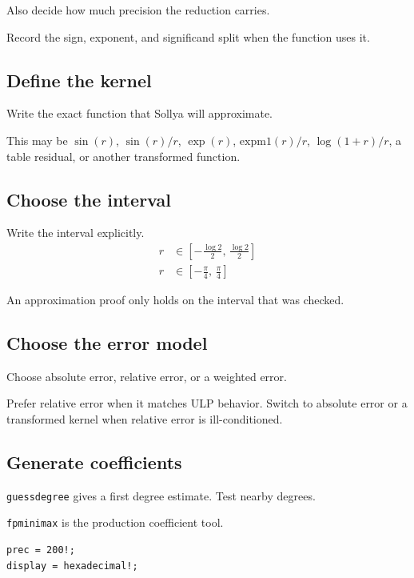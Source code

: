 \documentclass[manuscript, nonacm]{acmart}
\begin{document}
  Also decide how much precision the reduction carries.

  Record the sign, exponent, and significand split when the function uses it.

  \subsection{Define the kernel}

  Write the exact function that Sollya will approximate.

  This may be $\sin(r)$, $\sin(r)/r$, $\exp(r)$, $\mathrm{expm1}(r)/r$,
  $\log(1+r)/r$, a table residual, or another transformed function.

  \subsection{Choose the interval}

  Write the interval explicitly.
  \begin{align*}
    r &\in \left[-\frac{\log 2}{2},\, \frac{\log 2}{2}\right] \\[4pt]
    r &\in \left[-\frac{\pi}{4},\, \frac{\pi}{4}\right]
  \end{align*}

  An approximation proof only holds on the interval that was checked.

  \subsection{Choose the error model}

  Choose absolute error, relative error, or a weighted error.

  Prefer relative error when it matches ULP behavior. Switch to absolute error
  or a transformed kernel when relative error is ill-conditioned.

  \subsection{Generate coefficients}

  \texttt{guessdegree} gives a first degree estimate. Test nearby degrees.

  \texttt{fpminimax} is the production coefficient tool.

  \begin{lstlisting}[style=sollya]
prec = 200!;
display = hexadecimal!;
  \end{lstlisting}
\end{document}
